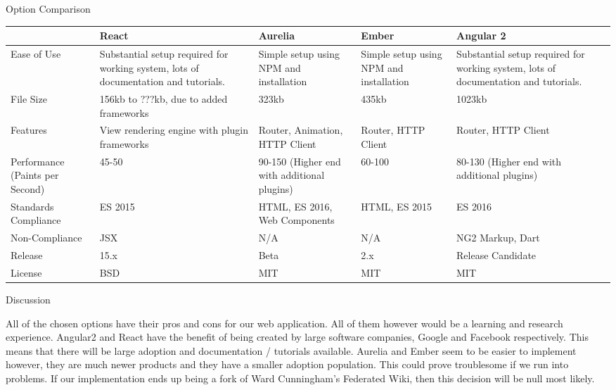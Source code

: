 \documentclass[letterpaper, 10pt, draftclsnofoot, compsoc, onecolumn]{IEEEtran}
\begin{document}
{{ \par}


\newpage
{\noindent Option Comparison \par}
\tablehead{}
\begin{supertabular}{|p{2cm}|p{2.5cm}|p{2.5cm}|p{2.5cm}|p{2.5cm}|}
\hline \cite{Eisenberg} & React & Aurelia  & Ember  & Angular 2 \\ \hline
Ease of Use & Substantial setup required for working system, lots of documentation and tutorials. & Simple setup using NPM and installation     & Simple setup using NPM and installation & Substantial setup required for working system, lots of documentation and tutorials. \\ \hline
File Size & 156kb to ???kb, due to added frameworks & 323kb & 435kb                                   & 1023kb \\ \hline
Features & View rendering engine with plugin frameworks & Router, Animation, HTTP Client & Router, HTTP Client & Router, HTTP Client                                                                 \\ \hline
Performance (Paints per Second) & 45-50 & 90-150 (Higher end with additional plugins) & 60-100 & 80-130 (Higher end with additional plugins) \\ \hline
Standards Compliance & ES 2015 & HTML, ES 2016, Web Components & HTML, ES 2015                           & ES 2016\\ \hline
Non-Compliance & JSX                                                                                 & N/A & N/A & NG2 Markup, Dart \\ \hline
Release & 15.x & Beta & 2.x  & Release Candidate \\ \hline
License & BSD & MIT & MIT & MIT \\ \hline
\end{supertabular}

\newpage
{\noindent Discussion \par}
{\noindent All of the chosen options have their pros and cons for our web application. All of them however would be a learning and research experience. Angular2 and React have the benefit of being created by large software companies, Google and Facebook respectively. This means that there will be large adoption and documentation / tutorials available. Aurelia and Ember seem to be easier to implement however, they are much newer products and they have a smaller adoption population. This could prove troublesome if we run into problems. If our implementation ends up being a fork of Ward Cunningham's Federated Wiki, then this decision will be null most likely. \par}

}
\end{document}
